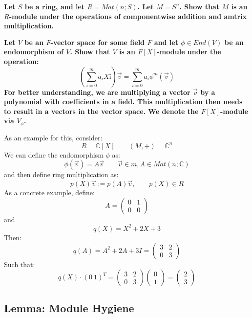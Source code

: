 \documentclass{exam}
\begin{document}
\begin{questions}

\question \textbf{Let $S$ be a ring, and let $R = Mat(n;S)$. Let $M = S^n$. Show that $M$ is an $R$-module under the operations of componentwise addition and amtrix multiplication.}

\question \textbf{Let $V$ be an $F$-vector space for some field $F$ and let $\phi \in End(V)$ be an endomorphism of $V$. Show that $V$ is an $F[X]$-module under the operation:
\[
\left(\sum_{i = 0}^m a_iXî\right)\vec{v} = \sum_{i = 0}^m a_i\phi^{m}(\vec{v})
\]
For better understanding, we are multiplying a vector $\vec{v}$ by a polynomial with coefficients in a field. This multiplication then needs to result in a vectors in the vector space. We denote the $F[X]$-module via $V_\phi$.}

As an example for this, consider:
\[
R = \mathbb{C}[X] \qquad (M,+) = \mathbb{C}^n
\]
We can define the endomorphism $\phi$ as:
\[
\phi(\vec{v}) = A\vec{v} \qquad \vec{v} \in m, A \in Mat(n;\mathbb{C})
\]
and then define ring multiplication as:
\[
p(X)\vec{v} := p(A)\vec{v}, \qquad p(X) \in R 
\]
As a concrete example, define:
\[
A = \begin{pmatrix}
0 & 1 \\
0 & 0
\end{pmatrix}
\]
and
\[
q(X) = X^2 + 2X + 3
\]
Then:
\[
q(A) = A^2 + 2A + 3I = \begin{pmatrix}
3 & 2 \\
0 & 3
\end{pmatrix}
\]
Such that:
\[
q(X) \cdot (0 \ 1)^T = \begin{pmatrix}
3 & 2 \\
0 & 3
\end{pmatrix}
\begin{pmatrix}
0 \\
1
\end{pmatrix}
=
\begin{pmatrix}
2 \\
3
\end{pmatrix}
\]

\end{questions}

\subsection{Lemma: Module Hygiene}

\end{document}
